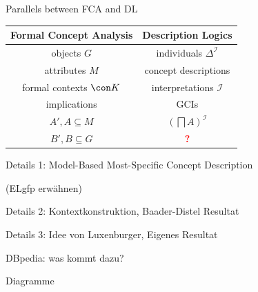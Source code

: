 \documentclass[ngerman]{beamer}
\begin{document}
\begin{frame}

  \onslide<+->

  \begin{block}{Parallels between FCA and DL}
    \begin{center}
      \begin{tabular}{c|c}
        Formal Concept Analysis & Description Logics\\
        \midrule\onslide<+->
        objects $G$ & individuals $\Delta^{\mathcal{I}}$ \\\onslide<+->
        attributes $M$ & concept descriptions \\\onslide<+->
        formal contexts $\con K$ & interpretations $\mathcal{I}$ \\\onslide<+->
        implications & GCIs \\\onslide<+->
        $A', A \subseteq M$ & $(\bigsqcap A)^{\mathcal{I}}$ \\\onslide<+->
        $B', B \subseteq G$ & \textcolor{red}{\textbf{?}}
      \end{tabular}
    \end{center}
  \end{block}

  Details 1: Model-Based Most-Specific Concept Description

  (ELgfp erwähnen)
\end{frame}

\begin{frame}
  Details 2: Kontextkonstruktion, Baader-Distel Resultat
\end{frame}

\begin{frame}
  Details 3: Idee von Luxenburger, Eigenes Resultat
\end{frame}

\begin{frame}
  DBpedia: was kommt dazu?
\end{frame}

\begin{frame}
  Diagramme
\end{frame}
\end{document}
